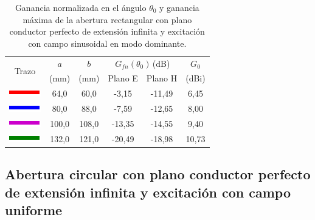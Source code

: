 \begin{table}[H]
\centering
\begin{tabular}{|c|c|c|c|c|c|}
\hline
\multirow{2}{*}{Trazo} & $a$ & $b$ & \multicolumn{2}{c|}{$G_{fn}\left(\theta_0\right)\,$(dB)} & $G_0$ \\
\cline{4-5}
& (mm) & (mm) & Plano E & Plano H & (dBi) \\
\hline
\includegraphics[scale = 1]{Figures/Estudio/linea_tabla_rojo} & 64,0 & 60,0 & -3,15 & -11,49 & 6,45 \\
\hline
\includegraphics[scale = 1]{Figures/Estudio/linea_tabla_azul} & 80,0 & 88,0 & -7,59 & -12,65 & 8,00 \\
\hline
\includegraphics[scale = 1]{Figures/Estudio/linea_tabla_violeta} & 100,0 & 108,0 & -13,35 & -14,55 & 9,40 \\
\hline
\includegraphics[scale = 1]{Figures/Estudio/linea_tabla_verde} & 132,0 & 121,0 & -20,49 & -18,98 & 10,73 \\
\hline
\end{tabular}
\caption{Ganancia normalizada en el ángulo $\theta_0$ y ganancia máxima de la abertura rectangular con plano conductor perfecto de extensión infinita y excitación con campo sinusoidal en modo dominante.}
\label{tabla_estudio:2}
\end{table}

\subsection{Abertura circular con plano conductor perfecto de extensión infinita y excitación con campo uniforme}
\label{subsec_estudio_abert_circ_inf_uni}

